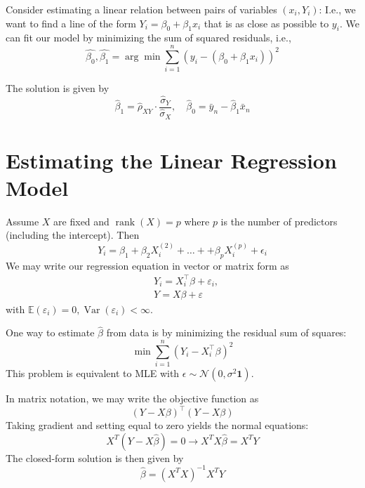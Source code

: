 \documentclass[11pt, %
	oneside, %
	english, %
	onehalfspacing, %
	]{article} %
\numberwithin{equation}{section}
\begin{document}
Consider estimating a linear relation between pairs of variables $(x_i, Y_i)$: I.e., we want to find a line of the form $Y_i = \beta_0 + \beta_1 x_i$ that is as close as possible to $y_i$. We can fit our model by minimizing the sum of squared residuals, i.e.,
\begin{equation*}
    \widehat{\beta_0}, \widehat{\beta_1} = \arg \min \sum_{i=1}^n\left(y_i-\left(\beta_0+\beta_1 x_i\right)\right)^2
\end{equation*}

The solution is given by
\begin{equation*}
    \hat{\beta}_1=\hat{\rho}_{X Y} \cdot \frac{\widehat{\sigma}_Y}{\hat{\sigma}_X}, \quad \hat{\beta}_0=\bar{y}_n-\hat{\beta}_1 \bar{x}_n
\end{equation*}



\clearpage

\section{Estimating the Linear Regression Model}

Assume $X$ are fixed and $\operatorname{rank}(X) = p$ where $p$ is the number of predictors (including the intercept). Then
\begin{equation*}
    Y_i = \beta_1 + \beta_2 X_i^{(2)} + \ldots + + \beta_p X_i^{(p)} + \epsilon_i
\end{equation*}
We may write our regression equation in vector or matrix form as
\begin{equation*}
    \begin{aligned}
        &Y_i=X_i^\top \beta+\varepsilon_i, \\
        &Y=X \beta+\varepsilon
    \end{aligned}
\end{equation*}
with $\mathbb{E}\left(\varepsilon_i\right)=0, \operatorname{Var}\left(\varepsilon_i\right)<\infty$.

One way to estimate $\hat{\beta}$ from data is by minimizing the residual sum of squares:
\begin{equation*}
    \min \sum_{i=1}^{n} \left(Y_i - X_i^\top \beta\right)^2
\end{equation*}
This problem is equivalent to MLE with $\epsilon \sim \mathcal{N}(0, \sigma^2 \mathbf{1})$.

In matrix notation, we may write the objective function as
\begin{equation*}
    (Y-X\beta)^\top (Y-X\beta)
\end{equation*}
Taking gradient and setting equal to zero yields the normal equations:
\begin{equation*}
    X^T(Y-X \hat{\beta})=0 \rightarrow X^T X \hat{\beta}=X^T Y
\end{equation*}
The closed-form solution is then given by
\begin{equation}\label{eq.betahat}
    \hat{\beta}=\left(X^T X\right)^{-1} X^T Y
\end{equation}
\end{document}
